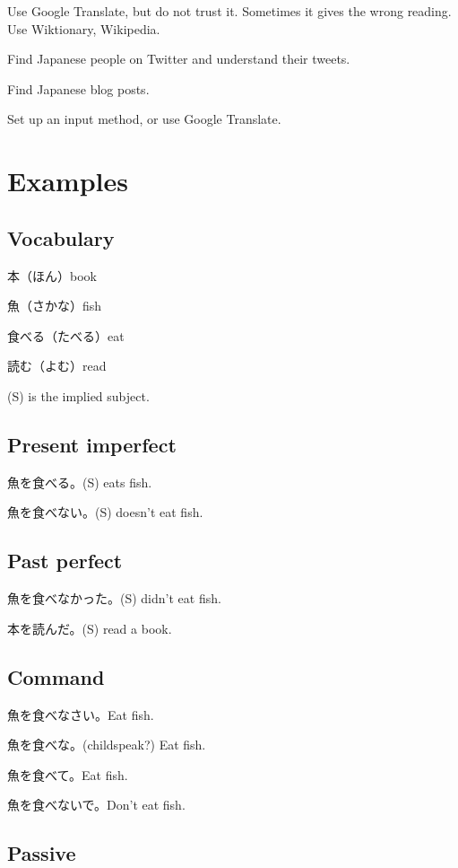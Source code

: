 \documentclass[12pt,a4paper,openany]{book}
\begin{document}
Use Google Translate, but do not trust it.
Sometimes it gives the wrong reading.
Use Wiktionary, Wikipedia.

Find Japanese people on Twitter and understand their tweets.

Find Japanese blog posts.

Set up an input method, or use Google Translate.

\chapter{Examples}


\section{Vocabulary}

本（ほん）book

魚（さかな）fish

食べる（たべる）eat

読む（よむ）read

(S) is the implied subject.

\section{Present imperfect}

魚を食べる。(S) eats fish.

魚を食べない。(S) doesn't eat fish.

\section{Past perfect}

魚を食べなかった。(S) didn't eat fish.

本を読んだ。(S) read a book.

\section{Command}

魚を食べなさい。Eat fish.

魚を食べな。(childspeak?) Eat fish.

魚を食べて。Eat fish.

魚を食べないで。Don't eat fish.

\section{Passive}
\end{document}
